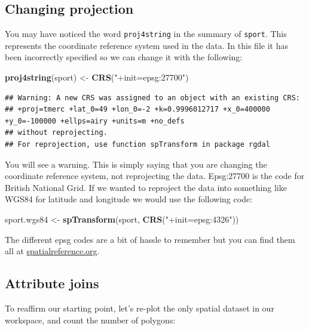 \documentclass[]{article}
\newenvironment{Shaded}{}{}
\newcommand{\KeywordTok}[1]{\textcolor[rgb]{0.00,0.44,0.13}{\textbf{{#1}}}}
\newcommand{\StringTok}[1]{\textcolor[rgb]{0.25,0.44,0.63}{{#1}}}
\newcommand{\NormalTok}[1]{{#1}}
\begin{document}
\subsection{Changing projection}

You may have noticed the word \texttt{proj4string} in the summary of
\texttt{sport}. This represents the coordinate reference system used in
the data. In this file it has been incorrectly specified so we can
change it with the following:

\begin{Shaded}
\begin{Highlighting}[]
\KeywordTok{proj4string}\NormalTok{(sport) <- }\KeywordTok{CRS}\NormalTok{(}\StringTok{"+init=epsg:27700"}\NormalTok{)}
\end{Highlighting}
\end{Shaded}
\begin{verbatim}
## Warning: A new CRS was assigned to an object with an existing CRS:
## +proj=tmerc +lat_0=49 +lon_0=-2 +k=0.9996012717 +x_0=400000 +y_0=-100000 +ellps=airy +units=m +no_defs
## without reprojecting.
## For reprojection, use function spTransform in package rgdal
\end{verbatim}
You will see a warning. This is simply saying that you are changing the
coordinate reference system, not reprojecting the data. Epsg:27700 is
the code for British National Grid. If we wanted to reproject the data
into something like WGS84 for latitude and longitude we would use the
following code:

\begin{Shaded}
\begin{Highlighting}[]
\NormalTok{sport.wgs84 <- }\KeywordTok{spTransform}\NormalTok{(sport, }\KeywordTok{CRS}\NormalTok{(}\StringTok{"+init=epsg:4326"}\NormalTok{))}
\end{Highlighting}
\end{Shaded}
The different epsg codes are a bit of hassle to remember but you can
find them all at
\href{http://spatialreference.org/}{spatialreference.org}.

\subsection{Attribute joins}

To reaffirm our starting point, let's re-plot the only spatial dataset
in our workspace, and count the number of polygons:
\end{document}
